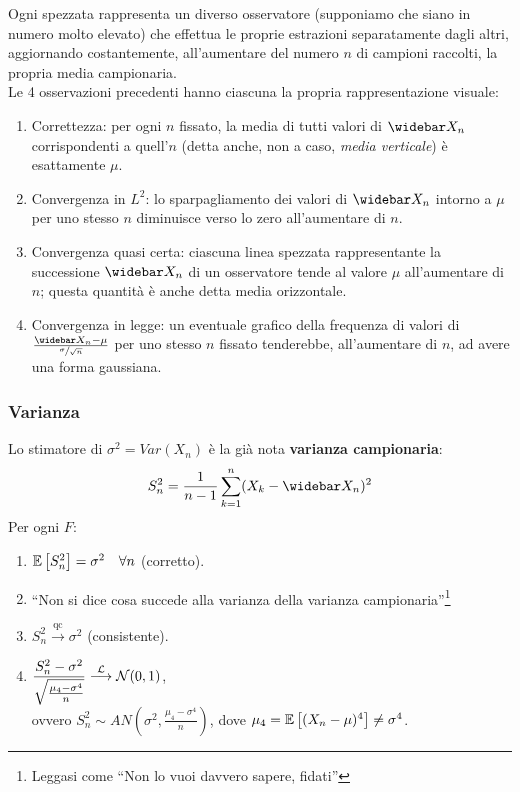 Ogni spezzata rappresenta un diverso osservatore (supponiamo che siano in numero molto elevato) che effettua le proprie estrazioni separatamente dagli altri, aggiornando costantemente, all'aumentare del numero $n$ di campioni raccolti, la propria media campionaria. \\
Le 4 osservazioni precedenti hanno ciascuna la propria rappresentazione visuale:
\begin{enumerate}
  \item Correttezza: per ogni $n$ fissato, la media di tutti valori di $\widebar X_n$ corrispondenti a quell'$n$ (detta anche, non a caso, \emph{media verticale}) è esattamente $\mu$.
  \item Convergenza in $L^2$: lo sparpagliamento dei valori di $\widebar X_n$ intorno a $\mu$ per uno stesso $n$ diminuisce verso lo zero all'aumentare di $n$.
  \item Convergenza quasi certa: ciascuna linea spezzata rappresentante la successione $\widebar X_n$ di un osservatore tende al valore $\mu$ all'aumentare di $n$; questa quantità è anche detta media orizzontale.
  \item Convergenza in legge: un eventuale grafico della frequenza di valori di $\frac{\widebar X_n-\mu}{\sfrac\sigma {\sqrt n}}$ per uno stesso $n$ fissato tenderebbe, all'aumentare di $n$, ad avere una forma gaussiana.
\end{enumerate}

\subsubsection{Varianza}
Lo stimatore di $\sigma^2 = Var(X_n)$ è la già nota \textbf{varianza campionaria}: $$S_n^2 = \frac 1 {n-1} \sum_{k=1}^n (X_k - \widebar X_n)^2$$
Per ogni $F$:
\begin{enumerate}
  \item $\mathbb E \left[ S_n^2 \right] = \sigma^2 \quad \forall n$ (corretto).
  \item ``Non si dice cosa succede alla varianza della varianza campionaria''\footnote{Leggasi come ``Non lo vuoi davvero sapere, fidati''}
  \item $S_n^2 \stackrel{\text{qc}}{\longrightarrow}  \sigma^2$ (consistente).
  \item $\dfrac{S_n^2-\sigma^2}{\sqrt{\frac{\mu_4-\sigma^4} n}} \stackrel{\mathcal L}{\longrightarrow} \mathcal N(0,1)$, \\ ovvero $S_n^2 \sim AN\left(\sigma^2,\frac{\mu_4 - \sigma^4} n\right)$, dove $\mu_4 = \mathbb E \left[ (X_n-\mu)^4 \right] \neq \sigma^4$.
\end{enumerate}
